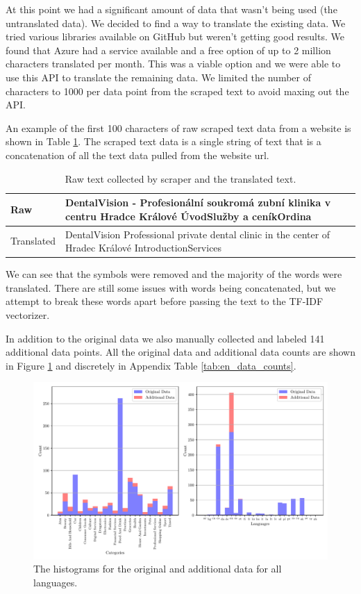 At this point we had a significant amount of data that wasn't being used (the untranslated data). We decided to find a way to translate the existing data. We tried various libraries available on GitHub but weren't getting good results. We found that Azure had a service available and a free option of up to 2 million characters translated per month. This was a viable option and we were able to use this API to translate the remaining data. We limited the number of characters to 1000 per data point from the scraped text to avoid maxing out the API.

An example of the first 100 characters of raw scraped text data from a website is shown in Table \ref{tab:text_examples}. The scraped text data is a single string of text that is a concatenation of all the text data pulled from the website url. 

\begin{table}[!ht]
\centering
\caption{Raw text collected by scraper and the translated text.}
\begin{tabular}{|l|p{10cm}|}
\hline
Raw & DentalVision - Profesionální soukromá zubní klinika v centru Hradce Králové ÚvodSlužby a ceníkOrdina \\ \hline
Translated & DentalVision Professional private dental clinic in the center of Hradec Králové IntroductionServices \\ \hline
\end{tabular}
\label{tab:text_examples}
\end{table}

We can see that the symbols were removed and the majority of the words were translated. There are still some issues with words being concatenated, but we attempt to break these words apart before passing the text to the TF-IDF vectorizer.

In addition to the original data we also manually collected and labeled 141 additional data points. All the original data and additional data counts are shown in Figure \ref{fig:all_hist} and discretely in Appendix Table \ref{tab:en_data_counts}.


\begin{figure}[!ht]
  \centering
  \includegraphics[width=\textwidth]{../img/plot_all_hist.pdf}
  \caption{The histograms for the original and additional data for all languages.}
  \label{fig:all_hist}
\end{figure}


